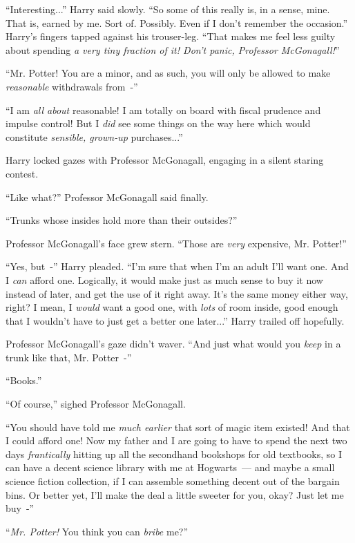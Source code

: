 ``Interesting...'' Harry said slowly. ``So some of this really is, in a sense, mine. That is, earned by me. Sort of. Possibly. Even if I don't remember the occasion.'' Harry's fingers tapped against his trouser-leg. ``That makes me feel less guilty about spending \emph{a very tiny fraction of it! Don't panic, Professor McGonagall!}''

``Mr. Potter! You are a minor, and as such, you will only be allowed to make \emph{reasonable} withdrawals from~-''

``I am \emph{all about} reasonable! I am totally on board with fiscal prudence and impulse control! But I \emph{did} see some things on the way here which would constitute \emph{sensible, grown-up} purchases...''

Harry locked gazes with Professor McGonagall, engaging in a silent staring contest.

``Like what?'' Professor McGonagall said finally.

``Trunks whose insides hold more than their outsides?''

Professor McGonagall's face grew stern. ``Those are \emph{very} expensive, Mr. Potter!''

``Yes, but~-'' Harry pleaded. ``I'm sure that when I'm an adult I'll want one. And I \emph{can} afford one. Logically, it would make just as much sense to buy it now instead of later, and get the use of it right away. It's the same money either way, right? I mean, I \emph{would} want a good one, with \emph{lots} of room inside, good enough that I wouldn't have to just get a better one later...'' Harry trailed off hopefully.

Professor McGonagall's gaze didn't waver. ``And just what would you \emph{keep} in a trunk like that, Mr. Potter~-''

``Books.''

``Of course,'' sighed Professor McGonagall.

``You should have told me \emph{much earlier} that sort of magic item existed! And that I could afford one! Now my father and I are going to have to spend the next two days \emph{frantically} hitting up all the secondhand bookshops for old textbooks, so I can have a decent science library with me at Hogwarts~--- and maybe a small science fiction collection, if I can assemble something decent out of the bargain bins. Or better yet, I'll make the deal a little sweeter for you, okay? Just let me buy~-''

``\emph{Mr. Potter!} You think you can \emph{bribe} me?''


